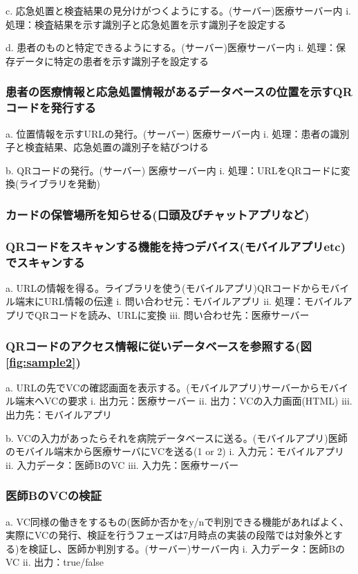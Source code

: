  
c.	応急処置と検査結果の見分けがつくようにする。(サーバー)医療サーバー内 
i.	処理：検査結果を示す識別子と応急処置を示す識別子を設定する 
 
 
d.	患者のものと特定できるようにする。(サーバー)医療サーバー内 
i.	処理：保存データに特定の患者を示す識別子を設定する 
 
\subsubsection{患者の医療情報と応急処置情報があるデータベースの位置を示すQRコードを発行する}
a.	位置情報を示すURLの発行。(サーバー) 医療サーバー内 
i.	処理：患者の識別子と検査結果、応急処置の識別子を結びつける 
 
 
b.	QRコードの発行。(サーバー) 医療サーバー内 
i.	処理：URLをQRコードに変換(ライブラリを発動) 
 
\subsubsection{カードの保管場所を知らせる(口頭及びチャットアプリなど)}
 
\subsubsection{QRコードをスキャンする機能を持つデバイス(モバイルアプリetc)でスキャンする}
a.	URLの情報を得る。ライブラリを使う(モバイルアプリ)QRコードからモバイル端末にURL情報の伝達 
i.	問い合わせ元：モバイルアプリ 
ii.	処理：モバイルアプリでQRコードを読み、URLに変換 
iii.	問い合わせ先：医療サーバー 
 
\subsubsection{QRコードのアクセス情報に従いデータベースを参照する(図\ref{fig:sample2})}
a.	URLの先でVCの確認画面を表示する。(モバイルアプリ)サーバーからモバイル端末へVCの要求 
i.	出力元：医療サーバー 
ii.	出力：VCの入力画面(HTML) 
iii.	出力先：モバイルアプリ 
 
 
b.	VCの入力があったらそれを病院データベースに送る。(モバイルアプリ)医師のモバイル端末から医療サーバにVCを送る(1 or 2) 
i.	入力元：モバイルアプリ 
ii.	入力データ：医師BのVC 
iii.	入力先：医療サーバー 
 
\subsubsection{医師BのVCの検証}
a.	VC同様の働きをするもの(医師か否かをy/nで判別できる機能があればよく、実際にVCの発行、検証を行うフェーズは7月時点の実装の段階では対象外とする)を検証し、医師か判別する。(サーバー)サーバー内 
i.	入力データ：医師BのVC 
ii.	出力：true/false 
 
